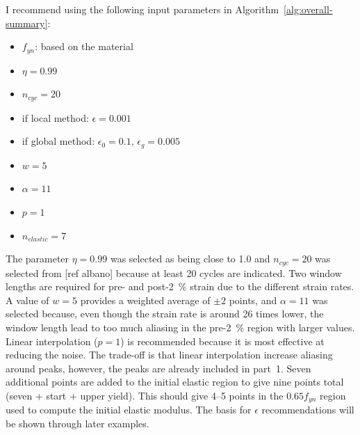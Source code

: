 \documentclass[a4paper,11pt]{article}
\begin{document}
I recommend using the following input parameters in Algorithm~\ref{alg:overall-summary}:
\begin{itemize}
    \item $f_{yn}$: based on the material
    \item $\eta = 0.99$
    \item $n_{cyc} = 20$
    \item if local method: $\epsilon = 0.001$
    \item if global method: $\epsilon_0 = 0.1$, $\epsilon_g = 0.005$
    \item $w = 5$
    \item $\alpha = 11$
    \item $p = 1$
    \item $n_{elastic} = 7$
\end{itemize}
The parameter $\eta = 0.99$ was selected as being close to 1.0 and $n_{cyc} = 20$ was selected from [ref albano] because at least 20 cycles are indicated.
Two window lengths are required for pre- and post-2~\% strain due to the different strain rates.
A value of $w = 5$ provides a weighted average of $\pm2$ points, and $\alpha = 11$ was selected because, even though the strain rate is around 26 times lower, the window length lead to too much aliasing in the pre-2~\% region with larger values.
Linear interpolation ($p = 1$) is recommended because it is most effective at reducing the noise.
The trade-off is that linear interpolation increase aliasing around peaks, however, the peaks are already included in part~1.
Seven additional points are added to the initial elastic region to give nine points total (seven + start + upper yield).
This should give 4--5 points in the $0.65 f_{yn}$ region used to compute the initial elastic modulus.
The basis for $\epsilon$ recommendations will be shown through later examples.
\end{document}
